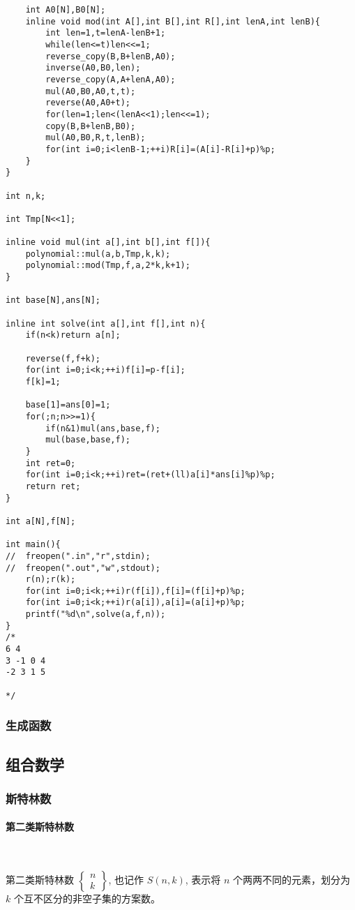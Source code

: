 \documentclass{ctexart}
\begin{document}
\begin{lstlisting}
    int A0[N],B0[N];
    inline void mod(int A[],int B[],int R[],int lenA,int lenB){
        int len=1,t=lenA-lenB+1;
        while(len<=t)len<<=1;
        reverse_copy(B,B+lenB,A0);
        inverse(A0,B0,len);
        reverse_copy(A,A+lenA,A0);
        mul(A0,B0,A0,t,t);
        reverse(A0,A0+t);
        for(len=1;len<(lenA<<1);len<<=1);
        copy(B,B+lenB,B0);
        mul(A0,B0,R,t,lenB);
        for(int i=0;i<lenB-1;++i)R[i]=(A[i]-R[i]+p)%p;
    }
}

int n,k;

int Tmp[N<<1];

inline void mul(int a[],int b[],int f[]){
    polynomial::mul(a,b,Tmp,k,k);
    polynomial::mod(Tmp,f,a,2*k,k+1);
}

int base[N],ans[N];

inline int solve(int a[],int f[],int n){
    if(n<k)return a[n];
    
    reverse(f,f+k);
    for(int i=0;i<k;++i)f[i]=p-f[i];
    f[k]=1;
    
    base[1]=ans[0]=1;
    for(;n;n>>=1){
        if(n&1)mul(ans,base,f);
        mul(base,base,f);
    }
    int ret=0;
    for(int i=0;i<k;++i)ret=(ret+(ll)a[i]*ans[i]%p)%p;
    return ret;
}

int a[N],f[N];

int main(){
//	freopen(".in","r",stdin);
//	freopen(".out","w",stdout);
    r(n);r(k);
    for(int i=0;i<k;++i)r(f[i]),f[i]=(f[i]+p)%p;
    for(int i=0;i<k;++i)r(a[i]),a[i]=(a[i]+p)%p;
    printf("%d\n",solve(a,f,n));
}
/*
6 4
3 -1 0 4
-2 3 1 5

*/

\end{lstlisting}
\subsubsection{生成函数}
\subsection{组合数学}
\subsubsection{斯特林数}

\paragraph{第二类斯特林数}\ 

第二类斯特林数 $ \begin{Bmatrix} n\\ k \end{Bmatrix}$, 也记作 $S(n,k)$, 表示将 $n$ 个两两不同的元素，划分为 $k$ 个互不区分的非空子集的方案数。
\end{document}
